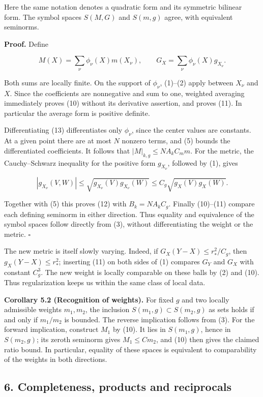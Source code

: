\documentclass[
  11pt,
]{article}
\begin{document}
Here the same notation denotes a quadratic form and its symmetric
bilinear form. The symbol spaces \(S(M,G)\) and \(S(m,g)\) agree, with
equivalent seminorms.

\textbf{Proof.} Define

\[
M(X)=\sum_\nu\phi_\nu(X)m(X_\nu),\qquad
G_X=\sum_\nu\phi_\nu(X)g_{X_\nu}.                            \tag{13}
\]

Both sums are locally finite. On the support of \(\phi_\nu\), (1)--(2)
apply between \(X_\nu\) and \(X\). Since the coefficients are
nonnegative and sum to one, weighted averaging immediately proves (10)
without its derivative assertion, and proves (11). In particular the
average form is positive definite.

Differentiating (13) differentiates only \(\phi_\nu\), since the center
values are constants. At a given point there are at most \(N\) nonzero
terms, and (5) bounds the differentiated coefficients. It follows that
\(|M|_{k,g}\leq NA_kC_m m\). For the metric, the Cauchy--Schwarz
inequality for the positive form \(g_{X_\nu}\), followed by (1), gives

\[
|g_{X_\nu}(V,W)|
\leq\sqrt{g_{X_\nu}(V)g_{X_\nu}(W)}
\leq C_g\sqrt{g_X(V)g_X(W)}.
\]

Together with (5) this proves (12) with \(B_k=NA_kC_g\). Finally
(10)--(11) compare each defining seminorm in either direction. Thus
equality and equivalence of the symbol spaces follow directly from (3),
without differentiating the weight or the metric. \(\square\)

The new metric is itself slowly varying. Indeed, if
\(G_X(Y-X)\leq r_*^2/C_g\), then \(g_X(Y-X)\leq r_*^2\); inserting (11)
on both sides of (1) compares \(G_Y\) and \(G_X\) with constant
\(C_g^3\). The new weight is locally comparable on these balls by (2)
and (10). Thus regularization keeps us within the same class of local
data.

\textbf{Corollary 5.2 (Recognition of weights).} For fixed \(g\) and two
locally admissible weights \(m_1,m_2\), the inclusion
\(S(m_1,g)\subset S(m_2,g)\) as sets holds if and only if \(m_1/m_2\) is
bounded. The reverse implication follows from (3). For the forward
implication, construct \(M_1\) by (10). It lies in \(S(m_1,g)\), hence
in \(S(m_2,g)\); its zeroth seminorm gives \(M_1\leq Cm_2\), and (10)
then gives the claimed ratio bound. In particular, equality of these
spaces is equivalent to comparability of the weights in both directions.

\subsection{6. Completeness, products and
reciprocals}\label{completeness-products-and-reciprocals}
\end{document}
